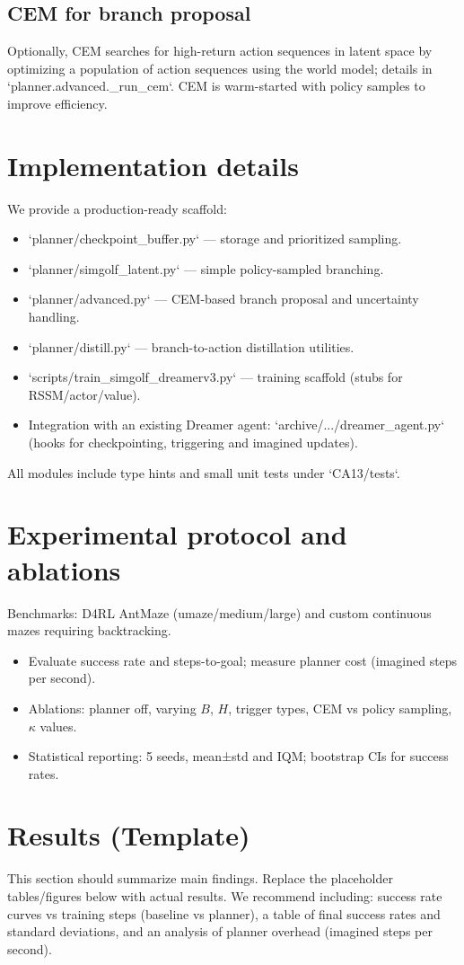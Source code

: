 \documentclass{article}
\begin{document}
\subsection{CEM for branch proposal}
Optionally, CEM searches for high-return action sequences in latent space by
optimizing a population of action sequences using the world model; details in
`planner.advanced._run_cem`. CEM is warm-started with policy samples to improve efficiency.

\section{Implementation details}
We provide a production-ready scaffold:
\begin{itemize}
\item `planner/checkpoint_buffer.py` — storage and prioritized sampling.
\item `planner/simgolf_latent.py` — simple policy-sampled branching.
\item `planner/advanced.py` — CEM-based branch proposal and uncertainty handling.
\item `planner/distill.py` — branch-to-action distillation utilities.
\item `scripts/train_simgolf_dreamerv3.py` — training scaffold (stubs for RSSM/actor/value).
\item Integration with an existing Dreamer agent: `archive/.../dreamer_agent.py` (hooks for checkpointing, triggering and imagined updates).
\end{itemize}
All modules include type hints and small unit tests under `CA13/tests`.

\section{Experimental protocol and ablations}
Benchmarks: D4RL AntMaze (umaze/medium/large) and custom continuous mazes requiring backtracking.
\begin{itemize}
\item Evaluate success rate and steps-to-goal; measure planner cost (imagined steps per second).
\item Ablations: planner off, varying \(B\), \(H\), trigger types, CEM vs policy sampling, \(\kappa\) values.
\item Statistical reporting: 5 seeds, mean±std and IQM; bootstrap CIs for success rates.
\end{itemize}

\section{Results (Template)}
\label{sec:results}
This section should summarize main findings. Replace the placeholder tables/figures below with actual results. We recommend including: success rate curves vs training steps (baseline vs planner), a table of final success rates and standard deviations, and an analysis of planner overhead (imagined steps per second).
\end{document}
